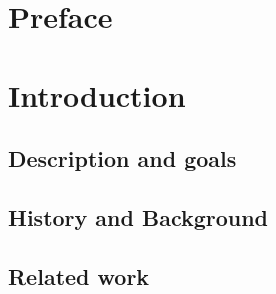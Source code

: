 \documentclass[BSP,english,oneside]{classes/gucthesis}
\begin{document}


\makefrontpages



\clearpage
\setcounter{page}{1}



\chapter*{Preface}
	\label{chap:preface}
	


\tableofcontents
\listoffigures


\newpage
\setcounter{page}{1}
\chapter{Introduction}
	
		\setcounter{page}{2}	%
		\label{sec:introduction}
		

	\section{Description and goals}
		\label{sec:description_goals}
		

	\section{History and Background}
		\label{sec:history_and_background}
		

	\section{Related work}
		\label{sec:related_work}
		
\end{document}
